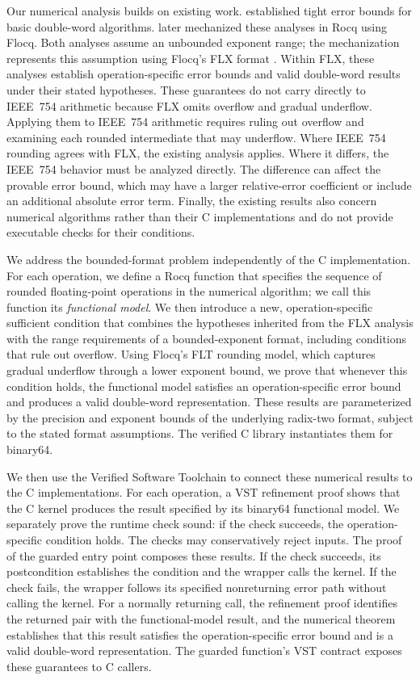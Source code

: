 Our numerical analysis builds on existing work.  \citet{Joldes2017} established
tight error bounds for basic double-word algorithms.  \citet{Rideau2022} later
mechanized these analyses in Rocq using Flocq.  Both analyses assume an
unbounded exponent range; the mechanization represents this assumption using
Flocq's FLX format \citep{Boldo2011}.  Within FLX, these analyses establish
operation-specific error bounds and valid double-word results under their
stated hypotheses.  These guarantees do not carry directly to IEEE~754
arithmetic because FLX omits overflow and gradual underflow.  Applying them to
IEEE~754 arithmetic requires ruling out overflow and examining each rounded
intermediate that may underflow.  Where IEEE~754 rounding agrees with FLX, the
existing analysis applies.  Where it differs, the IEEE~754 behavior must be
analyzed directly.  The difference can affect the provable error bound, which
may have a larger relative-error coefficient or include an additional absolute
error term. Finally, the existing results also concern numerical algorithms rather
than their C implementations and do not provide executable checks for their
conditions.

We address the bounded-format problem independently of the C implementation.
For each operation, we define a Rocq function that specifies the sequence of
rounded floating-point operations in the numerical algorithm; we call this
function its \emph{functional model}.  We then introduce a new,
operation-specific sufficient condition that combines the hypotheses inherited
from the FLX analysis with the range requirements of a bounded-exponent format,
including conditions that rule out overflow.  Using Flocq's FLT rounding model,
which captures gradual underflow through a lower exponent bound, we prove that
whenever this condition holds, the functional model satisfies an
operation-specific error bound and produces a valid double-word representation.
These results are parameterized by the precision and exponent bounds of the
underlying radix-two format, subject to the stated format assumptions.  The
verified C library instantiates them for binary64.

We then use the Verified Software Toolchain \citep{Appel2014} to connect these
numerical results to the C implementations.  For each operation, a VST
refinement proof shows that the C kernel produces the result specified by its
binary64 functional model.
We separately prove the runtime check sound: if the check succeeds, the
operation-specific condition holds.  The checks may conservatively reject
inputs.  The proof of the guarded entry point composes these results.  If the
check succeeds, its postcondition establishes the condition and the wrapper
calls the kernel.  If the check fails, the wrapper follows its specified
nonreturning error path without calling the kernel.  For a normally returning
call, the refinement proof identifies the returned pair with the functional-model
result, and the numerical theorem establishes that this result satisfies the
operation-specific error bound and is a valid double-word representation.  The
guarded function's VST contract exposes these guarantees to C callers.


